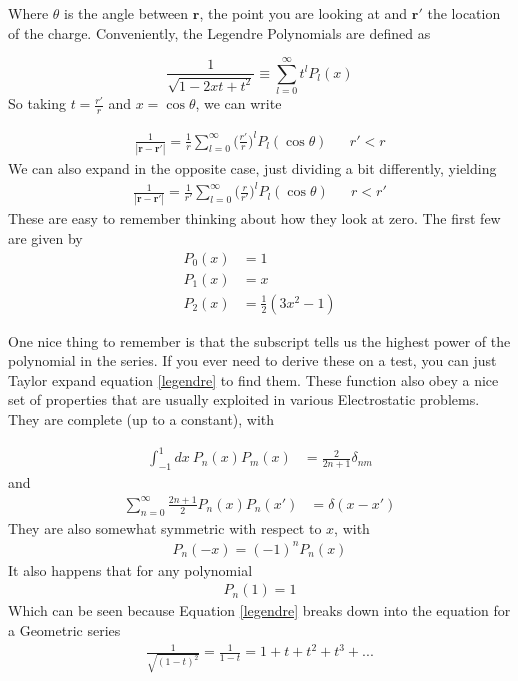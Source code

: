 Where $\theta$ is the angle between $\textbf{r}$, the point you are looking at and $\textbf{r}'$ the location of the charge. Conveniently, the Legendre Polynomials are defined as 

\begin{equation}\label{legendre}
\frac{1}{\sqrt{1-2xt+t^2}} \equiv \sum_{l=0}^\infty t^l P_l(x)
\end{equation}
So taking $t = \frac{r'}{r}$ and $x = \cos\theta$, we can write

\begin{align}
\frac{1}{|\textbf{r} - \textbf{r}'|} = \frac{1}{r} \sum_{l=0}^\infty \Big(\frac{r'}{r}\Big)^l P_l(\cos\theta) && r' < r
\end{align}
We can also expand in the opposite case, just dividing a bit differently, yielding
\begin{align}
\frac{1}{|\textbf{r} - \textbf{r}'|} = \frac{1}{r'} \sum_{l=0}^\infty \Big(\frac{r}{r'}\Big)^l P_l(\cos\theta) && r < r'
\end{align}
These are easy to remember thinking about how they look at zero. The first few are given by
\begin{align}
P_0(x) &= 1\\
P_1(x) &= x\\
P_2(x) &= \frac{1}{2}(3x^2 -1)
\end{align}

One nice thing to remember is that the subscript tells us the highest power of the polynomial in the series. If you ever need to derive these on a test, you can just Taylor expand equation \ref{legendre} to find them. These function also obey a nice set of properties that are usually exploited in various Electrostatic problems. They are complete (up to a constant), with

\begin{align}
\int^1_{-1} dx~ P_n(x) P_{m}(x) &= \frac{2}{2n+1}\delta_{nm}
\end{align}
and 
\begin{align}
\sum_{n=0}^\infty \frac{2n+1}{2}P_n(x)P_n(x') &= \delta(x-x')
\end{align}
They are also somewhat symmetric with respect to $x$, with
\begin{align}
P_n(-x) = (-1)^nP_n(x)
\end{align}
It also happens that for any polynomial 
\begin{align}
P_n(1) = 1
\end{align}
Which can be seen because Equation \ref{legendre} breaks down into the equation for a Geometric series
\begin{align}
\frac{1}{\sqrt{(1-t)^2}} = \frac{1}{1-t} = 1 + t + t^2 + t^3 + ...
\end{align}


